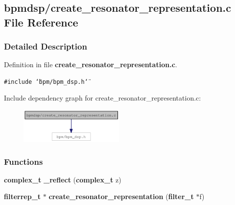 \subsection{bpmdsp/create\_\-resonator\_\-representation.c File Reference}
\label{create__resonator__representation_8c}


\subsubsection{Detailed Description}


Definition in file {\bf create\_\-resonator\_\-representation.c}.

{\tt \#include \char`\"{}bpm/bpm\_\-dsp.h\char`\"{}}\par


Include dependency graph for create\_\-resonator\_\-representation.c:\nopagebreak
\begin{figure}[H]
\begin{center}
\leavevmode
\includegraphics[width=146pt]{create__resonator__representation_8c__incl}
\end{center}
\end{figure}
\subsubsection*{Functions}
\begin{CompactItemize}
\item 
{\bf complex\_\-t} \textbf{\_\-reflect} ({\bf complex\_\-t} z)\label{create__resonator__representation_8c_5f5822799f26a42df071d1662eaafb19}

\item 
{\bf filterrep\_\-t} $\ast$ {\bf create\_\-resonator\_\-representation} ({\bf filter\_\-t} $\ast$f)
\end{CompactItemize}
